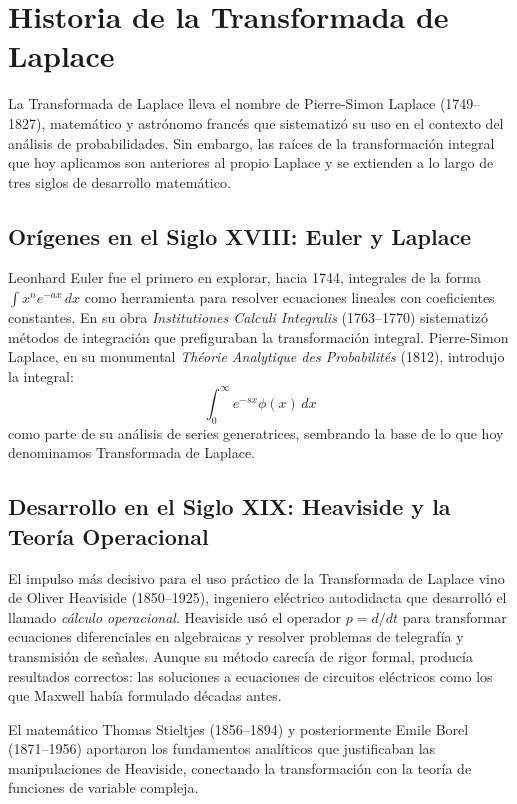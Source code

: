 \documentclass[12pt,letterpaper]{report}
\numberwithin{equation}{chapter}
\numberwithin{figure}{chapter}
\numberwithin{table}{chapter}
\begin{document}
\section{Historia de la Transformada de Laplace}

La Transformada de Laplace lleva el nombre de Pierre-Simon Laplace (1749–1827), matemático y astrónomo francés que sistematizó su uso en el contexto del análisis de probabilidades. Sin embargo, las raíces de la transformación integral que hoy aplicamos son anteriores al propio Laplace y se extienden a lo largo de tres siglos de desarrollo matemático.

\subsection{Orígenes en el Siglo XVIII: Euler y Laplace}

Leonhard Euler fue el primero en explorar, hacia 1744, integrales de la forma $\int x^n e^{-ax}\,dx$ como herramienta para resolver ecuaciones lineales con coeficientes constantes. En su obra \textit{Institutiones Calculi Integralis} (1763–1770) sistematizó métodos de integración que prefiguraban la transformación integral. Pierre-Simon Laplace, en su monumental \textit{Théorie Analytique des Probabilités} (1812), introdujo la integral:
\[
\int_0^\infty e^{-sx}\phi(x)\,dx
\]
como parte de su análisis de series generatrices, sembrando la base de lo que hoy denominamos Transformada de Laplace.

\subsection{Desarrollo en el Siglo XIX: Heaviside y la Teoría Operacional}

El impulso más decisivo para el uso práctico de la Transformada de Laplace vino de Oliver Heaviside (1850–1925), ingeniero eléctrico autodidacta que desarrolló el llamado \textit{cálculo operacional}. Heaviside usó el operador $p = d/dt$ para transformar ecuaciones diferenciales en algebraicas y resolver problemas de telegrafía y transmisión de señales. Aunque su método carecía de rigor formal, producía resultados correctos: las soluciones a ecuaciones de circuitos eléctricos como los que Maxwell había formulado décadas antes.

El matemático Thomas Stieltjes (1856–1894) y posteriormente Emile Borel (1871–1956) aportaron los fundamentos analíticos que justificaban las manipulaciones de Heaviside, conectando la transformación con la teoría de funciones de variable compleja.
\end{document}
